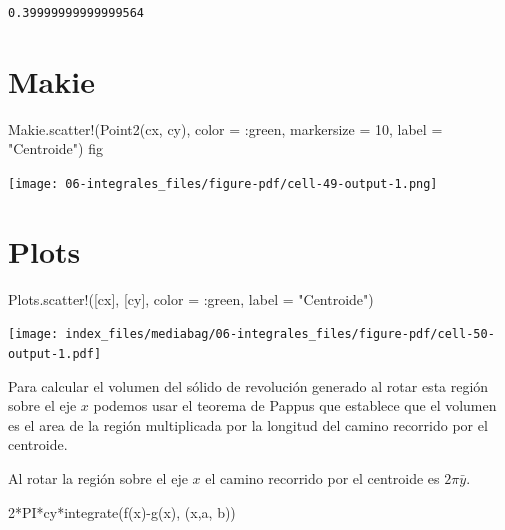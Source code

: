 \documentclass[
  a4paper,
]{scrreport}
\newenvironment{Shaded}{\begin{snugshade}}{\end{snugshade}}
\newcommand{\FloatTok}[1]{\textcolor[rgb]{0.68,0.00,0.00}{#1}}
\newcommand{\FunctionTok}[1]{\textcolor[rgb]{0.28,0.35,0.67}{#1}}
\newcommand{\NormalTok}[1]{\textcolor[rgb]{0.00,0.23,0.31}{#1}}
\newcommand{\OperatorTok}[1]{\textcolor[rgb]{0.37,0.37,0.37}{#1}}
\newcommand{\StringTok}[1]{\textcolor[rgb]{0.13,0.47,0.30}{#1}}
\theoremstyle{definition}
\theoremstyle{remark}
\begin{document}
\begin{tcolorbox}
\begin{verbatim}
0.39999999999999564
\end{verbatim}

\section{Makie}

\begin{Shaded}
\begin{Highlighting}[]
\NormalTok{Makie.}\FunctionTok{scatter!}\NormalTok{(}\FunctionTok{Point2}\NormalTok{(cx, cy), color }\OperatorTok{=} \OperatorTok{:}\NormalTok{green, markersize }\OperatorTok{=} \FloatTok{10}\NormalTok{, label }\OperatorTok{=} \StringTok{"Centroide"}\NormalTok{)}
\NormalTok{fig}
\end{Highlighting}
\end{Shaded}

\texttt{[image: 06-integrales\_files/figure-pdf/cell-49-output-1.png]}

\section{Plots}

\begin{Shaded}
\begin{Highlighting}[]
\NormalTok{Plots.}\FunctionTok{scatter!}\NormalTok{([cx], [cy], color }\OperatorTok{=} \OperatorTok{:}\NormalTok{green, label }\OperatorTok{=} \StringTok{"Centroide"}\NormalTok{)}
\end{Highlighting}
\end{Shaded}

\texttt{[image: index\_files/mediabag/06-integrales\_files/figure-pdf/cell-50-output-1.pdf]}

Para calcular el volumen del sólido de revolución generado al rotar esta
región sobre el eje \(x\) podemos usar el teorema de Pappus que
establece que el volumen es el area de la región multiplicada por la
longitud del camino recorrido por el centroide.

Al rotar la región sobre el eje \(x\) el camino recorrido por el
centroide es \(2\pi \bar y\).

\begin{Shaded}
\begin{Highlighting}[]
\FloatTok{2}\FunctionTok{*PI*cy*integrate}\NormalTok{(}\FunctionTok{f}\NormalTok{(x)}\FunctionTok{{-}g}\NormalTok{(x), (x,a, b))}
\end{Highlighting}
\end{Shaded}


\end{tcolorbox}
\end{document}
